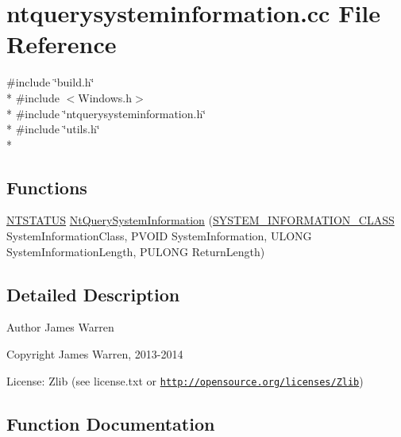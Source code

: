 \section{ntquerysysteminformation.\-cc File Reference}
\label{ntquerysysteminformation_8cc}
{\ttfamily \#include \char`\"{}build.\-h\char`\"{}}\\*
{\ttfamily \#include $<$Windows.\-h$>$}\\*
{\ttfamily \#include \char`\"{}ntquerysysteminformation.\-h\char`\"{}}\\*
{\ttfamily \#include \char`\"{}utils.\-h\char`\"{}}\\*
\subsection*{Functions}
\begin{DoxyCompactItemize}
\item 
\hyperlink{ntdll_8h_a77a2f6628aaa056315f8c8ad2c466fdc}{N\-T\-S\-T\-A\-T\-U\-S} \hyperlink{ntquerysysteminformation_8cc_ad89a2f8757b635e9e1799187d81c1b36}{Nt\-Query\-System\-Information} (\hyperlink{ntquerysysteminformation_8h_a6f4391292f166b482e5b633f423436d7}{S\-Y\-S\-T\-E\-M\-\_\-\-I\-N\-F\-O\-R\-M\-A\-T\-I\-O\-N\-\_\-\-C\-L\-A\-S\-S} System\-Information\-Class, P\-V\-O\-I\-D System\-Information, U\-L\-O\-N\-G System\-Information\-Length, P\-U\-L\-O\-N\-G Return\-Length)
\end{DoxyCompactItemize}


\subsection{Detailed Description}
\begin{DoxyAuthor}{Author}
James Warren 
\end{DoxyAuthor}
\begin{DoxyCopyright}{Copyright}
James Warren, 2013-\/2014 
\end{DoxyCopyright}
\begin{DoxyParagraph}{License\-:}
Zlib (see license.\-txt or \href{http://opensource.org/licenses/Zlib}{\tt http\-://opensource.\-org/licenses/\-Zlib}) 
\end{DoxyParagraph}


\subsection{Function Documentation}
